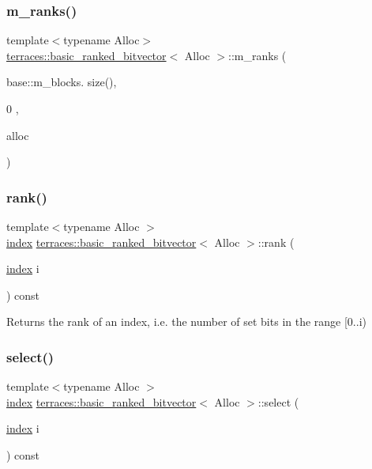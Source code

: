 \subsubsection{\texorpdfstring{m\+\_\+ranks()}{m\_ranks()}}
{\footnotesize\ttfamily template$<$typename Alloc$>$ \\
\hyperlink{classterraces_1_1basic__ranked__bitvector}{terraces\+::basic\+\_\+ranked\+\_\+bitvector}$<$ Alloc $>$\+::m\+\_\+ranks (\begin{DoxyParamCaption}\item[{base\+::m\+\_\+blocks.}]{size(),  }\item[{0}]{,  }\item[{alloc}]{ }\end{DoxyParamCaption})\hspace{0.3cm}{\ttfamily [inline]}}

\mbox{\label{classterraces_1_1basic__ranked__bitvector_a9e06ab9864653c65a1d4c8c8d72eaac1}} 
\subsubsection{\texorpdfstring{rank()}{rank()}}
{\footnotesize\ttfamily template$<$typename Alloc $>$ \\
\hyperlink{namespaceterraces_adbc33ccb543d1634e96d0eb02e472c77}{index} \hyperlink{classterraces_1_1basic__ranked__bitvector}{terraces\+::basic\+\_\+ranked\+\_\+bitvector}$<$ Alloc $>$\+::rank (\begin{DoxyParamCaption}\item[{\hyperlink{namespaceterraces_adbc33ccb543d1634e96d0eb02e472c77}{index}}]{i }\end{DoxyParamCaption}) const}

Returns the rank of an index, i.\+e. the number of set bits in the range \mbox{[}0..i) \mbox{\label{classterraces_1_1basic__ranked__bitvector_a56bd3b3ec826c18f78c6bd4012b8da8f}} 
\subsubsection{\texorpdfstring{select()}{select()}}
{\footnotesize\ttfamily template$<$typename Alloc $>$ \\
\hyperlink{namespaceterraces_adbc33ccb543d1634e96d0eb02e472c77}{index} \hyperlink{classterraces_1_1basic__ranked__bitvector}{terraces\+::basic\+\_\+ranked\+\_\+bitvector}$<$ Alloc $>$\+::select (\begin{DoxyParamCaption}\item[{\hyperlink{namespaceterraces_adbc33ccb543d1634e96d0eb02e472c77}{index}}]{i }\end{DoxyParamCaption}) const}

